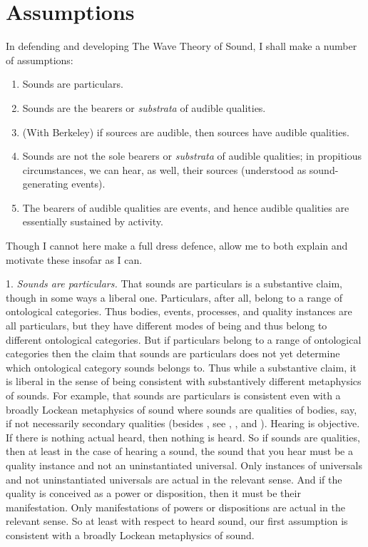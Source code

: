 \documentclass[12pt]{article}
\begin{document}

\section{Assumptions} %
\label{sec:section_name}

In defending and developing The Wave Theory of Sound, I shall make a number of assumptions:
\begin{enumerate}
	\item Sounds are particulars.
	\item Sounds are the bearers or \emph{substrata} of audible qualities.
	\item (With Berkeley) if sources are audible, then sources have audible qualities.
	\item Sounds are not the sole bearers or \emph{substrata} of audible qualities; in propitious circumstances, we can hear, as well, their sources (understood as sound-generating events).
	\item The bearers of audible qualities are events, and hence audible qualities are essentially sustained by activity.
\end{enumerate}
Though I cannot here make a full dress defence, allow me to both explain and motivate these insofar as I can.

1. \emph{Sounds are particulars.} That sounds are particulars is a substantive claim, though in some ways a liberal one. Particulars, after all, belong to a range of ontological categories. Thus bodies, events, processes, and quality instances are all particulars, but they have different modes of being and thus belong to different ontological categories. But if particulars belong to a range of ontological categories then the claim that sounds are particulars does not yet determine which ontological category sounds belongs to. Thus while a substantive claim, it is liberal in the sense of being consistent with substantively different metaphysics of sounds. For example, that sounds are particulars is consistent even with a broadly Lockean metaphysics of sound where sounds are qualities of bodies, say, if not necessarily secondary qualities (besides \citealt{Locke:1706hc}, see \citealt{Pasnau:1999ss}, \citealt{Kulvicki:2008aa}, and \citealt{Roberts:2017as}). Hearing is objective. If there is nothing actual heard, then nothing is heard. So if sounds are qualities, then at least in the case of hearing a sound, the sound that you hear must be a quality instance and not an uninstantiated universal. Only instances of universals and not uninstantiated universals are actual in the relevant sense. And if the quality is conceived as a power or disposition, then it must be their manifestation. Only manifestations of powers or dispositions are actual in the relevant sense. So at least with respect to heard sound, our first assumption is consistent with a broadly Lockean metaphysics of sound.
\end{document}
